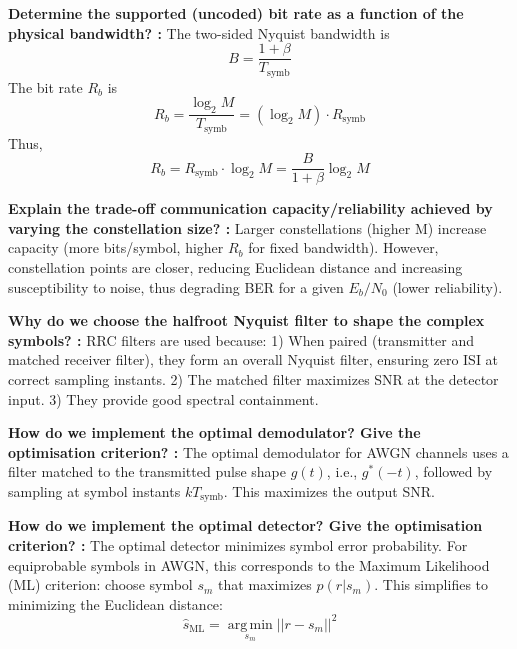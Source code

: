 \documentclass[11pt]{article}
\begin{document}
	\par\noindent\textbf{Determine the supported (uncoded) bit rate as a function of the physical bandwidth? :}\quad\ignorespaces 
		The two-sided Nyquist bandwidth is
		\begin{equation} B = \frac{1+\beta}{T_{\text{symb}}} \end{equation}
		The bit rate $R_b$ is
		\begin{equation} R_b = \frac{\log_2 M}{T_{\text{symb}}} = (\log_2 M) \cdot R_{\text{symb}} \end{equation}
		Thus,
		\begin{equation} R_b = R_{\text{symb}} \cdot \log_2 M = \frac{B}{1+\beta} \log_2 M \end{equation}
	\par
			
	\par\noindent\textbf{Explain the trade-off communication capacity/reliability achieved by varying the constellation size? :}\quad\ignorespaces 
		Larger constellations (higher M) increase capacity (more bits/symbol, higher $R_b$ for fixed bandwidth). However, constellation points are closer, reducing Euclidean distance and increasing susceptibility to noise, thus degrading BER for a given $E_b/N_0$ (lower reliability).
	\par
			
	\par\noindent\textbf{Why do we choose the halfroot Nyquist filter to shape the complex symbols? :}\quad\ignorespaces 
		RRC filters are used because: 1) When paired (transmitter and matched receiver filter), they form an overall Nyquist filter, ensuring zero ISI at correct sampling instants. 2) The matched filter maximizes SNR at the detector input. 3) They provide good spectral containment.
	\par
			
	\par\noindent\textbf{How do we implement the optimal demodulator? Give the optimisation criterion? :}\quad\ignorespaces 
		The optimal demodulator for AWGN channels uses a filter matched to the transmitted pulse shape $g(t)$, i.e., $g^*(-t)$, followed by sampling at symbol instants $kT_{\text{symb}}$. This maximizes the output SNR.
	\par
			
	\par\noindent\textbf{How do we implement the optimal detector? Give the optimisation criterion? :}\quad\ignorespaces 
		The optimal detector minimizes symbol error probability. For equiprobable symbols in AWGN, this corresponds to the Maximum Likelihood (ML) criterion: choose symbol $s_m$ that maximizes $p(r|s_m)$. This simplifies to minimizing the Euclidean distance:
		\begin{equation} \hat{s}_{\text{ML}} = \operatorname*{arg\,min}_{s_m} ||r - s_m||^2 \end{equation}
	\par
			
\end{document}
